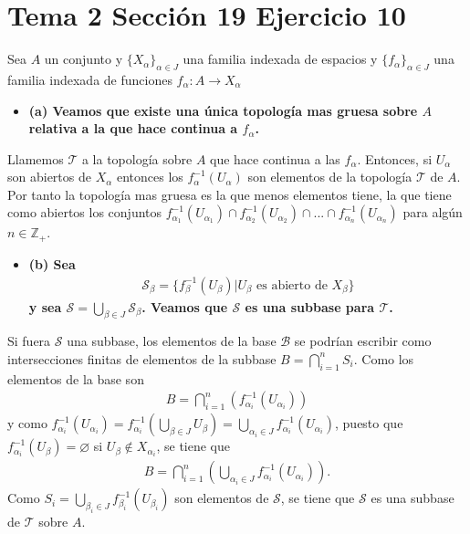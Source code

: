 \documentclass{article}
\begin{document}
\section{Tema 2 Sección 19 Ejercicio 10}
Sea $A$ un conjunto y $\{X_\alpha\}_{\alpha\in J}$ una familia indexada de espacios y $\{f_\alpha\}_{\alpha\in J}$ una familia indexada de funciones $f_\alpha:A\rightarrow X_\alpha$
\begin{itemize}
\item \bf (a) \rm Veamos que existe una única topología mas gruesa sobre $A$ relativa a la que hace continua a $f_\alpha$.
\end{itemize}
Llamemos $\mathcal{T}$ a la topología sobre $A$ que hace continua a las $f_\alpha$. Entonces, si $U_\alpha$ son abiertos de $X_\alpha$ entonces los $f^{-1}_\alpha(U_\alpha)$ son elementos de la topología $\mathcal{T}$ de $A$. Por tanto la topología mas gruesa es la que menos elementos tiene, la que tiene como abiertos los conjuntos  $f^{-1}_{\alpha_1}(U_{\alpha_1})\cap f^{-1}_{\alpha_2}(U_{\alpha_2})\cap ...\cap  f^{-1}_{\alpha_n}(U_{\alpha_n})$ para algún $n\in \mathbb{Z}_+$. 
\begin{itemize}
\item \bf (b) \rm Sea
\begin{eqnarray}
\mathcal{S}_\beta=\{f^{-1}_\beta(U_\beta)|U_\beta \text{ es abierto de }X_\beta\}
\end{eqnarray}
y sea $\mathcal{S}=\bigcup_{\beta \in J}\mathcal{S}_\beta$. Veamos que $\mathcal{S}$ es una subbase para $\mathcal{T}$.
\end{itemize}
Si fuera $\mathcal{S}$ una subbase, los elementos de la base $\mathcal{B}$ se podrían escribir como intersecciones finitas de elementos de la subbase $B=\bigcap_{i=1}^n S_i$. Como los elementos de la base son
\begin{eqnarray}
B=\bigcap_{i=1}^n \left(f^{-1}_{\alpha_i}(U_{\alpha_i})\right)
\end{eqnarray}
y como $f^{-1}_{\alpha_i}(U_{\alpha_i}) = f^{-1}_{\alpha_i}(\bigcup_{\beta\in J}U_\beta)=\bigcup_{\alpha_i\in J}f^{-1}_{\alpha_i} (U_{\alpha_i})$, puesto que $f^{-1}_{\alpha_i} (U_\beta)=\varnothing$ si $U_\beta\notin X_{\alpha_i}$, se tiene que  
\begin{eqnarray}
B=\bigcap_{i=1}^n \left(\bigcup_{\alpha_i \in J}f^{-1}_{\alpha_i}(U_{\alpha_i})\right).
\end{eqnarray}
Como $S_i=\bigcup_{\beta_i\in J}f^{-1}_{\beta_i}(U_{\beta_i})$ son elementos de $\mathcal{S}$, se tiene que $\mathcal{S}$ es una subbase de $\mathcal{T}$ sobre $A$. 
\end{document}
